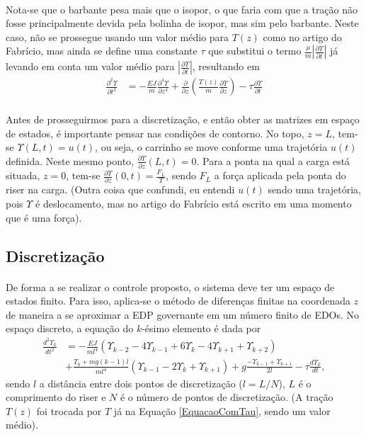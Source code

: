 \documentclass[a4paper,11pt]{scrartcl} %
\numberwithin{equation}{section} %
\numberwithin{figure}{section} %
\numberwithin{table}{section} %
\begin{document}
\paragraph{} Nota-se que o barbante pesa mais que o isopor, o que faria com que a tração não fosse principalmente devida pela bolinha de isopor, mas sim pelo barbante. Neste caso, não se prossegue usando um valor médio para $T(z)$ como no artigo do Fabrício, mas ainda se define uma constante $\tau$ que substitui o termo $\frac{\mu}{m}\left|\frac{\partial \Upsilon}{\partial t}\right|$ já levando em conta um valor médio para $\left|\frac{\partial \Upsilon}{\partial t}\right|$, resultando em \begin{align}
	\frac{\partial^2 \Upsilon}{\partial t^2} &= -\frac{EJ}{m}\frac{\partial^4 \Upsilon}{\partial z^4} + \frac{\partial}{\partial z}\left(\frac{T(z)}{m}\frac{\partial \Upsilon}{\partial z}\right) - \tau\frac{\partial \Upsilon}{\partial t}\label{EquacaoComTau}
	\end{align}
	
\paragraph{} Antes de prosseguirmos para a discretização, e então obter as matrizes em espaço de estados, é importante pensar nas condições de contorno. No topo, $z=L$, tem-se $\Upsilon(L,t)=u(t)$, ou seja, o carrinho se move conforme uma trajetória $u(t)$ definida. Neste mesmo ponto, $\frac{\partial\Upsilon}{\partial z}(L,t) = 0$. Para a ponta na qual a carga está situada, $z=0$, tem-se $\frac{\partial\Upsilon}{\partial z}(0,t) = \frac{F_L}{T}$, sendo $F_L$ a força aplicada pela ponta do riser na carga. (Outra coisa que confundi, eu entendi $u(t)$ sendo uma trajetória, pois $\Upsilon$ é deslocamento, mas no artigo do Fabrício está escrito em uma momento que é uma força).

\subsection{Discretização}
\paragraph{} De forma a se realizar o controle proposto, o sistema deve ter um espaço de estados finito. Para isso, aplica-se o método de diferenças finitas na coordenada $z$ de maneira a se aproximar a EDP governante em um número finito de EDOs. No espaço discreto, a equação do $k$-ésimo elemento é dada por \begin{align}
	\frac{d^2\Upsilon_k}{dt^2} &= -\frac{EJ}{m l^4}\left(\Upsilon_{k-2} - 4\Upsilon_{k-1}+6\Upsilon_{k}-4\Upsilon_{k+1}+\Upsilon_{k+2}\right)\nonumber\\
	&+ \frac{T_0+mg(k-1)l}{m l^4}\left(\Upsilon_{k-1}-2\Upsilon_{k} + \Upsilon_{k+1}\right)+g\frac{-\Upsilon_{k-1}+\Upsilon_{k+1}}{2l}-\tau\frac{d\Upsilon_k}{dt},
\end{align} sendo $l$ a distância entre dois pontos de discretização ($l = L/N$), $L$ é o comprimento do riser e $N$ é o número de pontos de discretização. (A tração $T(z)$ foi trocada por $T$ já na Equação  \ref{EquacaoComTau}, sendo um valor médio).
\end{document}
